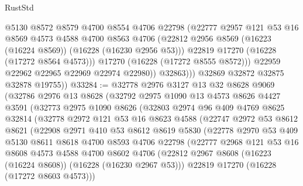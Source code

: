 \begin{lexlean}{RustStd}
\begin{coremodule}
                    @5130
                    @8572
                    @8579
                    @4700
                    @8554
                    @4706
                    @22798
                    (@22777
                      @2957
                      @121
                      @53
                      @16
                      @8569
                      @4573
                      @4588
                      @4700
                      @8563
                      @4706
                      (@22812 @2956 @8569 (@16223 (@16224 @8569)) (@16228 (@16230 @2956 @53)))
                      @22819
                      @17270
                      (@16228 (@17272 @8564 @4573)))
                    @17270
                    (@16228 (@17272 @8555 @8572)))
                  @22959
                  @22962
                  @22965
                  @22969
                  @22974
                  @22980))
              @32863)))
        @32869
        @32872
        @32875
        @32878
        @19755))
@33284 := @32778
    @2976
    @3127
    @13
    @32
    @8628
    @9069
    (@32786
      @2976
      @13
      @8628
      (@32792
        @2975
        @1090
        @13
        @4573
        @8626
        @4427
        @3591
        (@32773
          @2975
          @1090
          @8626
          (@32803
            @2974
            @96
            @409
            @4769
            @8625
            @32814
            (@32778
              @2972
              @121
              @53
              @16
              @8623
              @4588
              (@22747
                @2972
                @53
                @8612
                @8621
                (@22908
                  @2971
                  @410
                  @53
                  @8612
                  @8619
                  @5830
                  (@22778
                    @2970
                    @53
                    @409
                    @5130
                    @8611
                    @8618
                    @4700
                    @8593
                    @4706
                    @22798
                    (@22777
                      @2968
                      @121
                      @53
                      @16
                      @8608
                      @4573
                      @4588
                      @4700
                      @8602
                      @4706
                      (@22812 @2967 @8608 (@16223 (@16224 @8608)) (@16228 (@16230 @2967 @53)))
                      @22819
                      @17270
                      (@16228 (@17272 @8603 @4573)))

\end{coremodule}
\end{lexlean}

